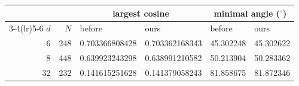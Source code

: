 \begin{tabular}{rrllll}
\toprule
 & & \multicolumn{2}{c}{largest cosine} & \multicolumn{2}{c}{minimal angle ($^\circ$)} \\
\cmidrule(lr){3-4}\cmidrule(lr){5-6}
$d$ & $N$ & before & ours & before & ours \\
\midrule
6 & 248 & 0.703366808428 & 0.703362168343 & 45.302248 & 45.302622 \\
8 & 448 & 0.639923243298 & 0.638991210582 & 50.213904 & 50.283362 \\
32 & 232 & 0.141615251628 & 0.141379058243 & 81.858675 & 81.872346 \\
\bottomrule
\end{tabular}
